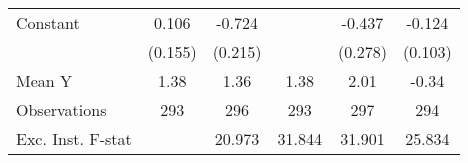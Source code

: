 {\begin{tabular}{l*{5}{c}}
\addlinespace
Constant            &       0.106         &      -0.724\sym{***}&                     &      -0.437         &      -0.124         \\
                    &     (0.155)         &     (0.215)         &                     &     (0.278)         &     (0.103)         \\
\midrule
Mean Y              &        1.38         &        1.36         &        1.38         &        2.01         &       -0.34         \\
Observations        &         293         &         296         &         293         &         297         &         294         \\
Exc. Inst. F-stat   &                     &      20.973         &      31.844         &      31.901         &      25.834         \\
\bottomrule
\end{tabular}
}
